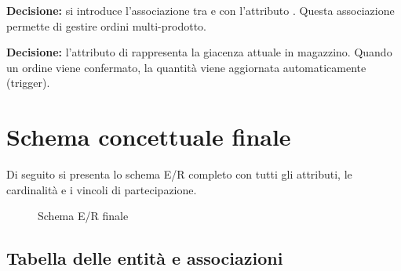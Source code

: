 \textbf{Decisione:} si introduce l'associazione  tra
 e  con l'attributo .
Questa associazione permette di gestire ordini multi-prodotto.

\textbf{Decisione:} l'attributo  di 
rappresenta la giacenza attuale in magazzino. Quando un ordine viene confermato,
la quantit\`{a} viene aggiornata automaticamente (trigger).

\section{Schema concettuale finale}

Di seguito si presenta lo schema E/R completo con tutti gli attributi, le
cardinalit\`{a} e i vincoli di partecipazione.

\begin{figure}[H]
  \centering
  \caption{Schema E/R finale}
  \label{fig:schema-er-finale}
\end{figure}

\subsection{Tabella delle entit\`{a} e associazioni}

